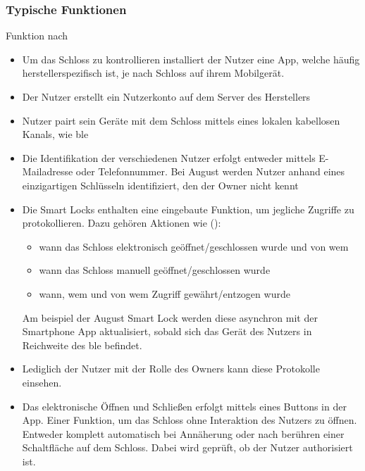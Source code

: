     \subsubsection{Typische Funktionen}
		Funktion nach \citeauthor{Ho2016}
		\begin{itemize}
		    \item Um das Schloss zu kontrollieren installiert der Nutzer eine App, welche häufig herstellerspezifisch ist, je nach Schloss auf ihrem Mobilgerät.
		    \item Der Nutzer erstellt ein Nutzerkonto auf dem Server des Herstellers
		    \item Nutzer pairt sein Geräte mit dem Schloss mittels eines lokalen kabellosen Kanals, wie \gls{ble}
		    \item Die Identifikation der verschiedenen Nutzer erfolgt entweder mittels E-Mailadresse oder Telefonnummer.
		        Bei August werden Nutzer anhand eines einzigartigen Schlüsseln identifiziert, den der Owner nicht kennt\cite{Fuller2017}
		    \item Die Smart Locks enthalten eine eingebaute Funktion, um jegliche Zugriffe zu protokollieren.
		        Dazu gehören Aktionen wie (\cite{Fuller2017}):
		        \begin{itemize}
		            \item wann das Schloss elektronisch geöffnet/geschlossen wurde und von wem
		            \item wann das Schloss manuell geöffnet/geschlossen wurde
		            \item wann, wem und von wem Zugriff gewährt/entzogen wurde
		        \end{itemize}
		        Am beispiel der August Smart Lock werden diese asynchron mit der Smartphone App aktualisiert, sobald sich das Gerät des Nutzers in Reichweite des \gls{ble} befindet.
		    \item Lediglich der Nutzer mit der Rolle des Owners kann diese Protokolle einsehen.
		    \item Das elektronische Öffnen und Schließen erfolgt mittels eines Buttons in der App.
		        Einer Funktion, um das Schloss ohne Interaktion des Nutzers zu öffnen.
		        Entweder komplett automatisch bei Annäherung oder nach berühren einer Schaltfläche auf dem Schloss.
		        Dabei wird geprüft, ob der Nutzer authorisiert ist.
		\end{itemize}

